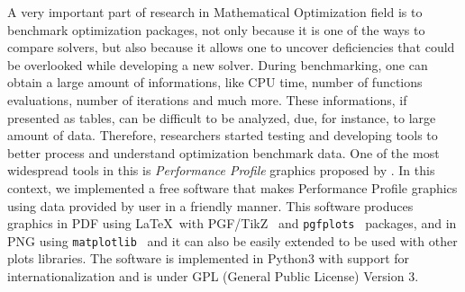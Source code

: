 A very important part of research in Mathematical Optimization field is to benchmark
optimization packages, not only because it is one of the ways to compare
solvers, but also because it allows one to uncover deficiencies that could
be overlooked while developing a new solver. During benchmarking, one can
obtain a large amount of  informations, like CPU time, number of functions
evaluations, number of iterations and much more. These informations, if
presented as tables, can be difficult to be analyzed, due, for instance, to
large amount of data.  Therefore, researchers started testing and developing
tools to better process and understand optimization benchmark data. One of
the most widespread tools in this is \emph{Performance Profile} graphics proposed by
\textcite{Dolan:2002du}. In this context, we implemented a free software
that makes Performance Profile graphics using data provided by user in a
friendly manner. This software produces graphics in PDF using \LaTeX\ with
PGF/TikZ~\cite{TikZ} and \texttt{pgfplots}~\cite{pgfplots} packages, and in
PNG using \texttt{matplotlib}~\cite{Hunter:2007} and it can also be easily
extended to be used with other plots libraries. The software is implemented
in Python3 with support for internationalization and is under GPL (General
Public License) Version 3.
